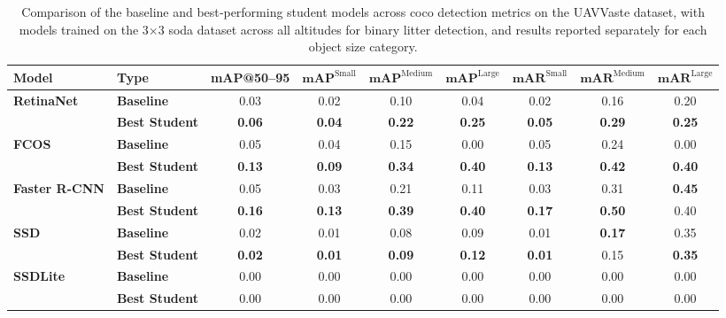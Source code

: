 \begin{table}[htbp]
\centering
\renewcommand{\arraystretch}{1.5} %
\begin{adjustbox}{width=\textwidth}
\begin{tabular}{llccccccc}
\hline
\textbf{Model} & \textbf{Type} & \textbf{mAP@50--95} & \(\mathbf{mAP}^{\text{Small}}\) & \(\mathbf{mAP}^{\text{Medium}}\) & \(\mathbf{mAP}^{\text{Large}}\) & \(\mathbf{mAR}^{\text{Small}}\) & \(\mathbf{mAR}^{\text{Medium}}\) & \(\mathbf{mAR}^{\text{Large}}\) \\ \hline
\multirow{2}{*}{\textbf{RetinaNet}} 
 & \textbf{Baseline}      & 0.03 & 0.02 & 0.10 & 0.04 & 0.02 & 0.16 & 0.20 \\
 & \textbf{Best Student}  & \textbf{0.06} & \textbf{0.04} & \textbf{0.22} & \textbf{0.25} & \textbf{0.05} & \textbf{0.29} & \textbf{0.25} \\ \hline
\multirow{2}{*}{\textbf{FCOS}} 
 & \textbf{Baseline}      & 0.05 & 0.04 & 0.15 & 0.00 & 0.05 & 0.24 & 0.00 \\
 & \textbf{Best Student}  & \textbf{0.13} & \textbf{0.09} & \textbf{0.34} & \textbf{0.40} & \textbf{0.13} & \textbf{0.42} & \textbf{0.40} \\ \hline
\multirow{2}{*}{\textbf{Faster R-CNN}} 
 & \textbf{Baseline}      & 0.05 & 0.03 & 0.21 & 0.11 & 0.03 & 0.31 & \textbf{0.45} \\
 & \textbf{Best Student}  & \textbf{0.16} & \textbf{0.13} & \textbf{0.39} & \textbf{0.40} & \textbf{0.17} & \textbf{0.50} & 0.40 \\ \hline
\multirow{2}{*}{\textbf{SSD}} 
 & \textbf{Baseline}      & 0.02 & 0.01 & 0.08 & 0.09 & 0.01 & \textbf{0.17} & 0.35 \\
 & \textbf{Best Student}  & \textbf{0.02} & \textbf{0.01} & \textbf{0.09} & \textbf{0.12} & \textbf{0.01} & 0.15 & \textbf{0.35} \\ \hline
\multirow{2}{*}{\textbf{SSDLite}} 
 & \textbf{Baseline}      & 0.00 & 0.00 & 0.00 & 0.00 & 0.00 & 0.00 & 0.00 \\
 & \textbf{Best Student}  & 0.00 & 0.00 & 0.00 & 0.00 & 0.00 & 0.00 & 0.00 \\ \hline
\end{tabular}
\end{adjustbox}
\caption{Comparison of the baseline and best‐performing student models across \gls{coco} detection metrics on the UAVVaste dataset, with models trained on the 3$\times$3 \gls{soda} dataset across all altitudes for binary litter detection, and results reported separately for each object size category.}
\label{tab:uavvaste_object_sizes_split}
\end{table}

